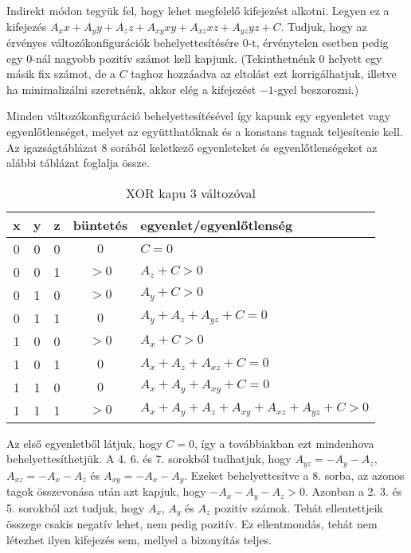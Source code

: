 Indirekt módon tegyük fel, hogy lehet megfelelő kifejezést alkotni. Legyen ez a kifejezés $A_xx+A_yy+A_zz+A_{xy}xy+A_{xz}xz+A_{yz}yz+C$. Tudjuk, hogy az érvényes változókonfigurációk behelyettesítésére $0$-t, érvénytelen esetben pedig egy $0$-nál nagyobb pozitív számot kell kapjunk. 
(Tekinthetnénk $0$ helyett egy másik fix számot, de a $C$ taghoz hozzáadva az eltolást ezt korrigálhatjuk, illetve ha minimalizálni szeretnénk, akkor elég a kifejezést $-1$-gyel beszorozni.)

Minden változókonfiguráció behelyettesítésével így kapunk egy egyenletet vagy egyenlőtlenséget, melyet az együtthatóknak és a konstans tagnak teljesítenie kell. Az igazságtáblázat 8 sorából keletkező egyenleteket és egyenlőtlenségeket az alábbi táblázat foglalja össze.

\begin{table}[ht]
	\footnotesize
	\centering
	\begin{tabular}{ c c c c l }
		\toprule
		x & y & z & büntetés & egyenlet/egyenlőtlenség \\
		\midrule
		0 & 0 & 0 & $0 $ & $C=0$   \\
		0 & 0 & 1 & $>0$ & $A_{z}+C>0$ \\
		0 & 1 & 0 & $>0$ & $A_{y}+C>0$ \\
		0 & 1 & 1 & $0 $ & $A_{y}+A_{z}+A_{yz}+C=0$   \\
		1 & 0 & 0 & $>0$ & $A_{x}+C>0$ \\
		1 & 0 & 1 & $0 $ & $A_{x}+A_{z}+A_{xz}+C=0$   \\
		1 & 1 & 0 & $0 $ & $A_{x}+A_{y}+A_{xy}+C=0$   \\
		1 & 1 & 1 & $>0$ & $A_{x}+A_{y}+A_{z}+A_{xy}+A_{xz}+A_{yz}+C>0$ \\				
		\bottomrule
	\end{tabular}
	\caption{XOR kapu 3 változóval}
	\label{tab:XORgate3var}
\end{table}

Az első egyenletből látjuk, hogy $C=0$, így a továbbiakban ezt mindenhova behelyettesíthetjük. A 4. 6. és 7. sorokból tudhatjuk, hogy $A_{yz}=-A_y-A_z$, $A_{xz}=-A_x-A_z$ és $A_{xy}=-A_x-A_y$. Ezeket behelyettesítve a 8. sorba, az azonos tagok összevonása után azt kapjuk, hogy $-A_x-A_y-A_z>0$.
Azonban a 2. 3. és 5. sorokból azt tudjuk, hogy $A_x$, $A_y$ és $A_z$ pozitív számok. Tehát ellentettjeik összege csakis negatív lehet, nem pedig pozitív. Ez ellentmondás, tehát nem létezhet ilyen kifejezés sem, mellyel a bizonyítás teljes.


